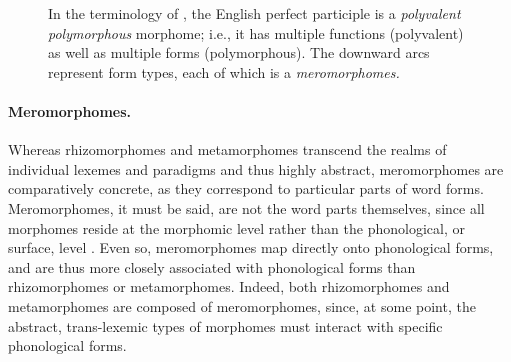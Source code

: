 \begin{figure}[ht]
\centering
\label{fig:ppgraph}
\caption{In the terminology of \cite{aronoff}, the English perfect participle  is a \emph{polyvalent polymorphous} morphome; i.e., it has multiple functions (polyvalent) as well as multiple forms (polymorphous). The downward arcs represent form types, each of which is a \emph{meromorphomes.}}
\end{figure}

\paragraph{Meromorphomes.} Whereas rhizomorphomes and metamorphomes 
transcend the realms of individual lexemes and paradigms and thus highly 
abstract, meromorphomes are comparatively concrete, as they 
correspond to particular parts of word forms. Meromorphomes, it must be said, 
are not the word parts themselves, since all morphomes reside at the 
morphomic level rather than the phonological, or surface, level \citep{round:2011}. 
Even so, meromorphomes map directly onto phonological forms, and 
are thus more closely associated with phonological forms than rhizomorphomes 
or metamorphomes. Indeed, both rhizomorphomes and metamorphomes are 
composed of meromorphomes, since, at some point, the abstract, trans-lexemic 
types of morphomes must interact with specific phonological forms. 

